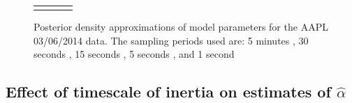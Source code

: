 \documentclass[10pt]{article}
\newcommand{\halpha}{\hat{\alpha}}
\begin{document}
\begin{figure}[h!]
\begin{tabular}{m{0.25cm}ccc}
\begin{minipage}{0.20\textwidth}
				\end{minipage}
	\end{tabular}
	\caption{Posterior density approximations of model parameters
          for the AAPL 03/06/2014 data. The sampling periods used are:
          5 minutes \usebox{\legendLineOne}, 30 seconds
          \usebox{\legendLineTwo}, 15 seconds
          \usebox{\legendLineThree}, 5 seconds
          \usebox{\legendLineFour}, and 1 second
          \usebox{\legendLineFive}}
	\label{fig:posterior-parameters-real}
\end{figure}

\subsection{Effect of timescale of inertia on estimates of $\halpha$}\label{se:effect-timescale}
\end{document}
